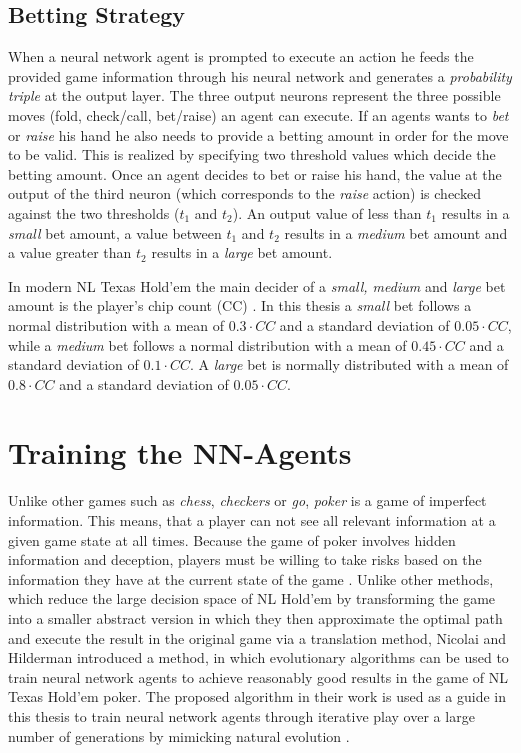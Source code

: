 \subsection{Betting Strategy}
\label{subsec:betting}
When a neural network agent is prompted to execute an action he feeds the provided game information through his neural network and generates a \textit{probability triple} at the output layer. The three output neurons represent the three possible moves (fold, check/call, bet/raise) an agent can execute. If an agents wants to \textit{bet} or \textit{raise} his hand he also needs to provide a betting amount in order for the move to be valid. This is realized by specifying two threshold values which decide the betting amount. Once an agent decides to bet or raise his hand, the value at the output of the third neuron (which corresponds to the \textit{raise} action) is checked against the two thresholds ($t_1$ and $t_2$). An output value of less than $t_1$ results in a \textit{small} bet amount, a value between $t_1$ and $t_2$ results in a \textit{medium} bet amount and a value greater than $t_2$ results in a \textit{large} bet amount.\par
	In modern NL Texas Hold'em the main decider of a \textit{small, medium} and \textit{large} bet amount is the player's chip count (CC) \cite{evolutionary_methods}. In this thesis a \textit{small} bet follows a normal distribution with a mean of $0.3 \cdot CC$ and a standard deviation of $0.05 \cdot CC$, while a \textit{medium} bet follows a normal distribution with a mean of $0.45 \cdot CC$ and a standard deviation of $0.1 \cdot CC$. A \textit{large} bet is normally distributed with a mean of $0.8 \cdot CC$ and a standard deviation of $0.05 \cdot CC$.
\pagebreak
\section{Training the NN-Agents}
Unlike other games such as \textit{chess}, \textit{checkers} or \textit{go}, \textit{poker} is a game of imperfect information. This means, that a player can not see all relevant  information at a given game state at all times. Because the game of poker involves hidden information and deception, players must be willing to take risks based on the information they have at the current state of the game \cite{nn_evolve}. Unlike other methods, which reduce the large decision space of NL Hold'em by transforming the game into a smaller abstract version in which they then approximate the optimal path and execute the result in the original game via a translation method, Nicolai and Hilderman \cite{nn_evolve} introduced a method, in which evolutionary algorithms can be used to train neural network agents to achieve reasonably good results in the game of NL Texas Hold'em poker. The proposed algorithm in their work is used as a guide in this thesis to train neural network agents through iterative play over a large number of generations by mimicking natural evolution \cite{nn_evolve}.
